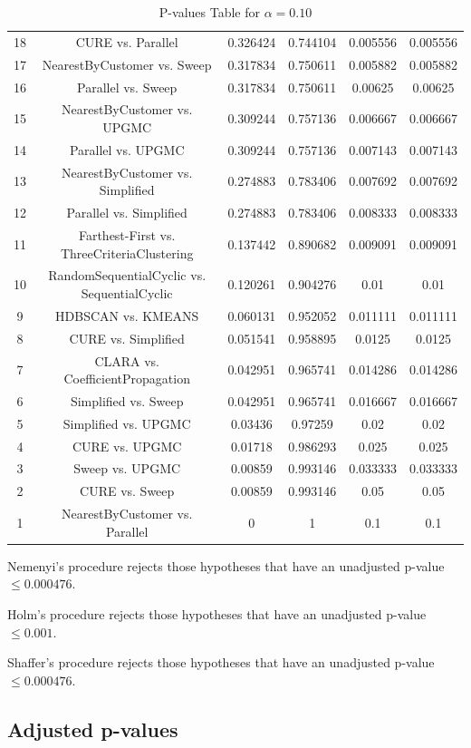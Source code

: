 \documentclass[a4paper,10pt]{article}
\begin{document}
\begin{landscape}
\begin{table}[!htp]
\begin{tabular}{cccccc}
18&CURE vs. Parallel&0.326424&0.744104&0.005556&0.005556\\
17&NearestByCustomer vs. Sweep&0.317834&0.750611&0.005882&0.005882\\
16&Parallel vs. Sweep&0.317834&0.750611&0.00625&0.00625\\
15&NearestByCustomer vs. UPGMC&0.309244&0.757136&0.006667&0.006667\\
14&Parallel vs. UPGMC&0.309244&0.757136&0.007143&0.007143\\
13&NearestByCustomer vs. Simplified&0.274883&0.783406&0.007692&0.007692\\
12&Parallel vs. Simplified&0.274883&0.783406&0.008333&0.008333\\
11&Farthest-First vs. ThreeCriteriaClustering&0.137442&0.890682&0.009091&0.009091\\
10&RandomSequentialCyclic vs. SequentialCyclic&0.120261&0.904276&0.01&0.01\\
9&HDBSCAN vs. KMEANS&0.060131&0.952052&0.011111&0.011111\\
8&CURE vs. Simplified&0.051541&0.958895&0.0125&0.0125\\
7&CLARA vs. CoefficientPropagation&0.042951&0.965741&0.014286&0.014286\\
6&Simplified vs. Sweep&0.042951&0.965741&0.016667&0.016667\\
5&Simplified vs. UPGMC&0.03436&0.97259&0.02&0.02\\
4&CURE vs. UPGMC&0.01718&0.986293&0.025&0.025\\
3&Sweep vs. UPGMC&0.00859&0.993146&0.033333&0.033333\\
2&CURE vs. Sweep&0.00859&0.993146&0.05&0.05\\
1&NearestByCustomer vs. Parallel&0&1&0.1&0.1\\
\hline
\end{tabular}
\caption{P-values Table for $\alpha=0.10$}
\end{table}Nemenyi's procedure rejects those hypotheses that have an unadjusted p-value $\le0.000476$.

Holm's procedure rejects those hypotheses that have an unadjusted p-value $\le0.001$.

Shaffer's procedure rejects those hypotheses that have an unadjusted p-value $\le0.000476$.

\pagebreak

\subsection{Adjusted p-values}


\end{landscape}
\end{document}
